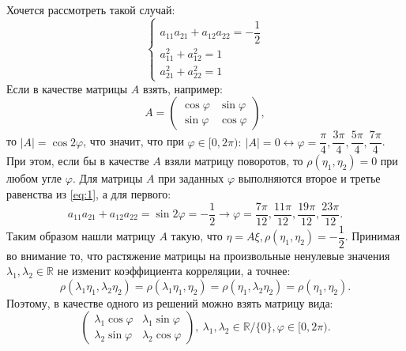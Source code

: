 \documentclass[specialist,
substylefile = spbu_report.rtx,
subf,href,colorlinks=true, 12pt]{disser}
\newcommand{\R}{\mathbb{R}}
\begin{document}
	Хочется рассмотреть такой случай:
	\begin{equation}
	\begin{cases}
		a_{11}a_{21} + a_{12}a_{22} = -\dfrac{1}{2}\\
		a_{11}^2 + a_{12}^2 = 1 \label{eq:1}\\
		a_{21}^2 + a_{22}^2 = 1
	\end{cases}
	\end{equation}
	Если в качестве матрицы $A$ взять, например:
	\begin{equation*}
		A = 
	\begin{pmatrix}
		\cos\varphi & \sin\varphi\\
		\sin\varphi& \cos\varphi
	\end{pmatrix},
	\end{equation*}
	то $|A| = \cos2\varphi$, что значит, что при $\varphi\in[0,2\pi):~|A| = 0 \leftrightarrow \varphi = \dfrac{\pi}{4}, \dfrac{3\pi}{4}, \dfrac{5\pi}{4}, \dfrac{7\pi}{4}$. При этом, если бы в качестве $A$ взяли матрицу поворотов, то $\rho(\eta_1, \eta_2) = 0$ при любом угле $\varphi$. Для матрицы $A$ при заданных $\varphi$ выполняются второе и третье равенства из \eqref{eq:1}, а для первого:
	\begin{equation*}
		a_{11}a_{21}+a_{12}a_{22} = \sin2\varphi = -\dfrac{1}{2}\rightarrow\varphi = \dfrac{7\pi}{12},\dfrac{11\pi}{12},\dfrac{19\pi}{12},\dfrac{23\pi}{12}.	
	\end{equation*}
	Таким образом нашли матрицу $A$ такую, что $\eta = A\xi, \rho(\eta_1, \eta_2) = -\dfrac{1}{2}$. Принимая во внимание то, что растяжение матрицы на произвольные ненулевые значения $\lambda_1,\lambda_2\in\R$ не изменит коэффициента корреляции, а точнее:
	\begin{equation*}
		\rho(\lambda_1\eta_1, \lambda_2\eta_2) = \rho(\lambda_1\eta_1, \eta_2) = \rho(\eta_1, \lambda_2\eta_2) = \rho(\eta_1, \eta_2).
	\end{equation*}
	Поэтому, в качестве одного из решений можно взять матрицу вида:
	\begin{equation*}
		\begin{pmatrix}
			\lambda_1\cos\varphi & \lambda_1\sin\varphi\\
			\lambda_2\sin\varphi& \lambda_2\cos\varphi
		\end{pmatrix},
		~\lambda_1,\lambda_2\in\R/\{0\}, \varphi\in[0, 2\pi).
	\end{equation*}
\end{document}
